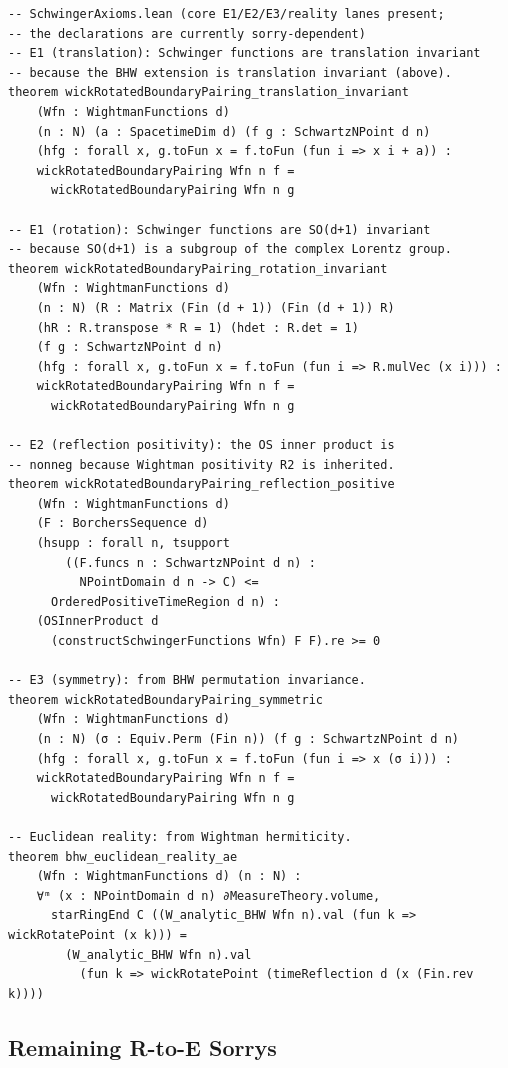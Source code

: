 \documentclass[11pt,a4paper]{article}
\begin{document}
\begin{lstlisting}
-- SchwingerAxioms.lean (core E1/E2/E3/reality lanes present;
-- the declarations are currently sorry-dependent)
-- E1 (translation): Schwinger functions are translation invariant
-- because the BHW extension is translation invariant (above).
theorem wickRotatedBoundaryPairing_translation_invariant
    (Wfn : WightmanFunctions d)
    (n : N) (a : SpacetimeDim d) (f g : SchwartzNPoint d n)
    (hfg : forall x, g.toFun x = f.toFun (fun i => x i + a)) :
    wickRotatedBoundaryPairing Wfn n f =
      wickRotatedBoundaryPairing Wfn n g

-- E1 (rotation): Schwinger functions are SO(d+1) invariant
-- because SO(d+1) is a subgroup of the complex Lorentz group.
theorem wickRotatedBoundaryPairing_rotation_invariant
    (Wfn : WightmanFunctions d)
    (n : N) (R : Matrix (Fin (d + 1)) (Fin (d + 1)) R)
    (hR : R.transpose * R = 1) (hdet : R.det = 1)
    (f g : SchwartzNPoint d n)
    (hfg : forall x, g.toFun x = f.toFun (fun i => R.mulVec (x i))) :
    wickRotatedBoundaryPairing Wfn n f =
      wickRotatedBoundaryPairing Wfn n g

-- E2 (reflection positivity): the OS inner product is
-- nonneg because Wightman positivity R2 is inherited.
theorem wickRotatedBoundaryPairing_reflection_positive
    (Wfn : WightmanFunctions d)
    (F : BorchersSequence d)
    (hsupp : forall n, tsupport
        ((F.funcs n : SchwartzNPoint d n) :
          NPointDomain d n -> C) <=
      OrderedPositiveTimeRegion d n) :
    (OSInnerProduct d
      (constructSchwingerFunctions Wfn) F F).re >= 0

-- E3 (symmetry): from BHW permutation invariance.
theorem wickRotatedBoundaryPairing_symmetric
    (Wfn : WightmanFunctions d)
    (n : N) (σ : Equiv.Perm (Fin n)) (f g : SchwartzNPoint d n)
    (hfg : forall x, g.toFun x = f.toFun (fun i => x (σ i))) :
    wickRotatedBoundaryPairing Wfn n f =
      wickRotatedBoundaryPairing Wfn n g

-- Euclidean reality: from Wightman hermiticity.
theorem bhw_euclidean_reality_ae
    (Wfn : WightmanFunctions d) (n : N) :
    ∀ᵐ (x : NPointDomain d n) ∂MeasureTheory.volume,
      starRingEnd C ((W_analytic_BHW Wfn n).val (fun k => wickRotatePoint (x k))) =
        (W_analytic_BHW Wfn n).val
          (fun k => wickRotatePoint (timeReflection d (x (Fin.rev k))))
\end{lstlisting}

\subsection{Remaining R-to-E Sorrys}
\end{document}
